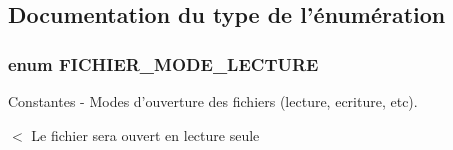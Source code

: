 \subsection{Documentation du type de l'énumération}
\subsubsection{\setlength{\rightskip}{0pt plus 5cm}enum {\bf FICHIER\_\-MODE\_\-LECTURE}}\label{_fichier_acces_8php_6c60b0dbb25a7e131527aac7cd1f445e}


Constantes - Modes d'ouverture des fichiers (lecture, ecriture, etc). 

$<$ Le fichier sera ouvert en lecture seule 